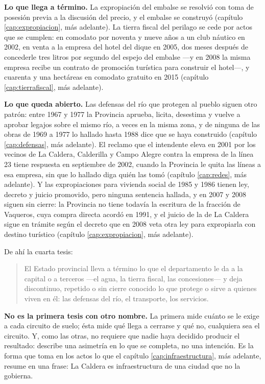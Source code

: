 \textbf{Lo que llega a término.} La expropiación del embalse se resolvió con toma de posesión previa a la discusión del precio, y el embalse se construyó (capítulo \ref{cap:expropiacion}, más adelante). La tierra fiscal del perilago se cede por actos que se cumplen: en comodato por noventa y nueve años a un club náutico en 2002, en venta a la empresa del hotel del dique en 2005, dos meses después de concederle tres litros por segundo del espejo del embalse ---y en 2008 la misma empresa recibe un contrato de promoción turística para construir el hotel---, y cuarenta y una hectáreas en comodato gratuito en 2015 (capítulo \ref{cap:tierrafiscal}, más adelante).

\textbf{Lo que queda abierto.} Las defensas del río que protegen al pueblo siguen otro patrón: entre 1967 y 1977 la Provincia aprueba, licita, desestima y vuelve a aprobar legajos sobre el mismo río, a veces en la misma zona, y de ninguna de las obras de 1969 a 1977 lo hallado hasta 1988 dice que se haya construido (capítulo \ref{cap:defensas}, más adelante). El reclamo que el intendente eleva en 2001 por los vecinos de La Caldera, Calderilla y Campo Alegre contra la empresa de la línea 23 tiene respuesta en septiembre de 2002, cuando la Provincia le quita las líneas a esa empresa, sin que lo hallado diga quién las tomó (capítulo \ref{cap:redes}, más adelante). Y las expropiaciones para vivienda social de 1985 y 1986 tienen ley, decreto y juicio promovido, pero ninguna sentencia hallada, y en 2007 y 2008 siguen sin cierre: la Provincia no tiene todavía la escritura de la fracción de Vaqueros, cuya compra directa acordó en 1991, y el juicio de la de La Caldera sigue en trámite según el decreto que en 2008 veta otra ley para expropiarla con destino turístico (capítulo \ref{cap:expropiacion}, más adelante).

De ahí la cuarta tesis:

\begin{quote}
El Estado provincial lleva a término lo que el departamento le da a la capital o a terceros ---el agua, la tierra fiscal, las concesiones--- y deja discontinuo, repetido o sin cierre conocido lo que protege o sirve a quienes viven en él: las defensas del río, el transporte, los servicios.
\end{quote}

\textbf{No es la primera tesis con otro nombre.} La primera mide cuánto se le exige a cada circuito de suelo; ésta mide qué llega a cerrarse y qué no, cualquiera sea el circuito. Y, como las otras, no requiere que nadie haya decidido producir el resultado: describe una asimetría en lo que se completa, no una intención. Es la forma que toma en los actos lo que el capítulo \ref{cap:infraestructura}, más adelante, resume en una frase: La Caldera es infraestructura de una ciudad que no la gobierna.

